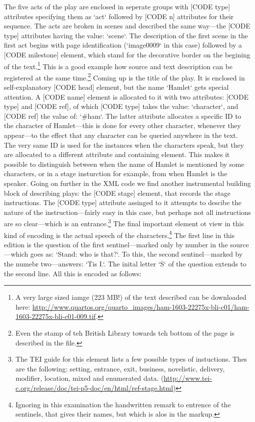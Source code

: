 \documentclass{article}
\begin{document}
The five acts of the play are enclosed in seperate groups with [CODE type] attributes specifying them as `act` followed by [CODE n] attributes for their sequence. The acts are broken in scenes and described the same way---the [CODE type] attributes having the value: `scene`. The description of the first scene in the first act begins with page identification (`image0009` in this case) followed by a [CODE milestone] element, which stand for the decorative border on the begining of the text.\footnote{A very large sized iamge (223 MB!) of the text described can be downloaded here: \url{http://www.quartos.org/quarto_images/ham-1603-22275x-bli-c01/ham-1603-22275x-bli-c01-009.tif}.} This is a good example how source and text description can be registered at the same time.\footnote{Even the stamp of teh British Library towards teh bottom of the page is described in the file.} Coming up is the title of the play. It is enclosed in self-explanatory [CODE head] element, but the name `Hamlet` gets special attention. A [CODE name] element is allocated to it with two attributes: [CODE type] and [CODE ref], of which [CODE type] takes the value: `character`, and [CODE ref] the value of: `#ham`. The latter attribute allocates a specific ID to the character of Hamlet---this is done for every other character, whenever they appear---to the effect that any character can be queried anywhere in the text. The very same ID is used for the instances when the characters speak, but they are allocated to a different attribute and containing element. This makes it possible to distinguish between when the name of Hamlet is mentioned by some characters, or in a stage insturction for example, from when Hamlet is the speaker. Going on further in the XML code we find another instrumental building block of describing plays: the [CODE stage] element, that records the stage instructions. The [CODE type] attribute assinged to it attempts to descibe the nature of the instruction---fairly easy in this case, but perhaps not all instructions are so clear---which is an entrance.\footnote{The TEI guide for this element lists a few possible types of instuctions. Thes are the following: setting, entrance, exit, business, novelistic, delivery, modifier, location, mixed and enumerated data. (\url{http://www.tei-c.org/release/doc/tei-p5-doc/en/html/ref-stage.html})} The final important element ot view in this kind of encoding is the actual speech of the characters.\footnote{Ignoring in this examination the handwritten remark to entrence of the sentinels, that gives their names, but which is alos in the markup.} The first line in this edition is the question of the first sentinel---marked only by number in the source---which goes as: `Stand: who is that?`. To this, the second sentinel---marked by the numebr two---answers: `Tis I.`. The inital letter `S` of the question extends to the second line. All this is encoded as follows:
\end{document}
